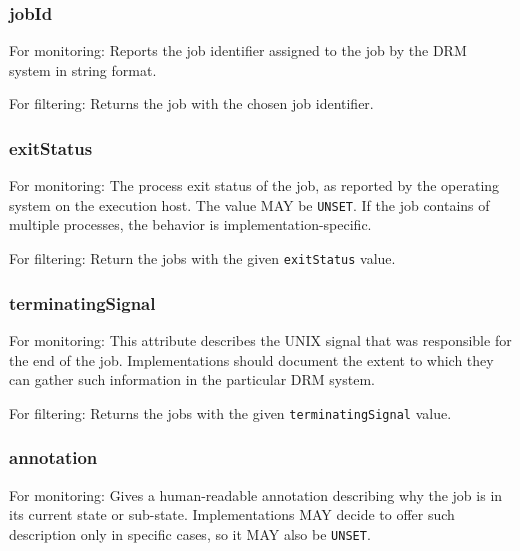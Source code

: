 \documentclass{article}
\newcommand{\h}[1]{\lstinline|#1|}
\newcommand{\rat}[1]{}
\begin{document}
\subsubsection{jobId}

For monitoring: Reports the job identifier assigned to the job by the DRM system in string format.

For filtering: Returns the job with the chosen job identifier.

\subsubsection{exitStatus}

For monitoring: The process exit status of the job, as reported by the operating system on the execution host. The value MAY be \h{UNSET}. If the job contains of multiple processes, the behavior is implementation-specific.

For filtering: Return the jobs with the given \h{exitStatus} value. 

\rat{Jobs without exit status information should be filtered out by asking for the appropriate states.}

\rat{June 29th 2011 conf call decided to explicitly decline any relationship between job status and exit code, since there is no common behavior in DRM systems. For this reason, exit status is allowed to be UNSET, without giving any further reasons. It is, however, expected that many implementations will put this on UNSET in the non-terminal job states.
}

\subsubsection{terminatingSignal}

For monitoring: This attribute describes the UNIX signal that was responsible for the end of the job. Implementations should document the extent to which they can gather such information in the particular DRM system.

For filtering: Returns the jobs with the given \h{terminatingSignal} value.

\subsubsection{annotation}

For monitoring: Gives a human-readable annotation describing why the job is in its current state or sub-state. Implementations MAY decide to offer such description only in specific cases, so it MAY also be \h{UNSET}.
\end{document}
